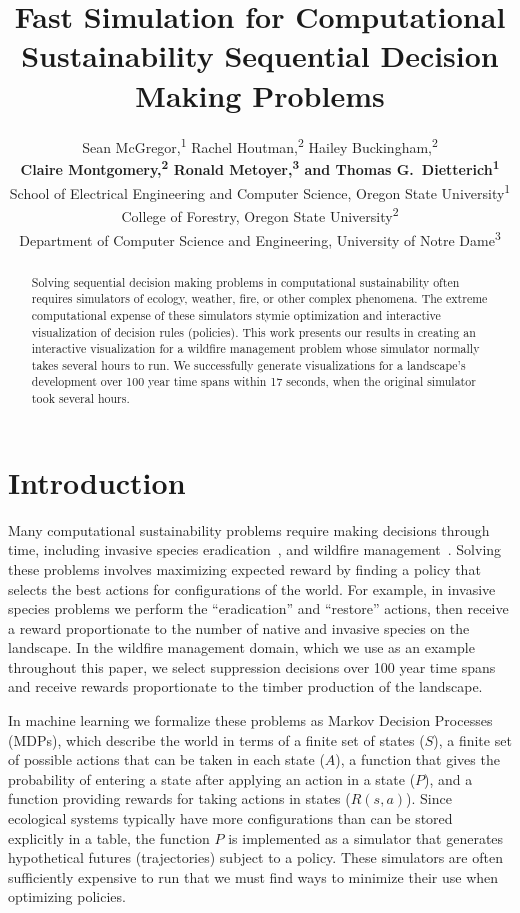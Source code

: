 \documentclass{article}
\title{Fast Simulation for Computational Sustainability Sequential Decision Making Problems}
\author{
  Sean McGregor,\textsuperscript{1} Rachel Houtman,\textsuperscript{2} Hailey Buckingham,\textsuperscript{2} \\
  \textbf{Claire Montgomery,\textsuperscript{2} Ronald Metoyer,\textsuperscript{3} and Thomas G.~Dietterich\textsuperscript{1}}\\
  School of Electrical Engineering and Computer Science, Oregon State University\textsuperscript{1}\\
  College of Forestry, Oregon State University\textsuperscript{2}\\
  Department of Computer Science and Engineering, University of Notre Dame\textsuperscript{3}\\
}
\begin{document}

\maketitle

\begin{abstract}
  Solving sequential decision making problems in computational sustainability
  often requires simulators of ecology, weather, fire, or other complex phenomena.
  The extreme computational expense of these simulators stymie
  optimization and interactive visualization of decision rules (policies).
  This work presents
  our results in creating an interactive visualization for
  a wildfire management problem whose simulator normally takes
  several hours to run. We successfully generate visualizations
  for a landscape's development over 100 year time spans within
  17 seconds, when the original simulator took several hours.
\end{abstract}

\section{Introduction}

Many computational sustainability problems require making decisions through
time, including invasive species eradication~\cite{Dietterich2013}, and
wildfire management~\cite{Houtman2013}.
Solving these problems involves maximizing expected reward
by finding a policy
that selects the best actions for configurations of the world. For example,
in invasive species problems we perform the ``eradication''
and ``restore'' actions, then receive a reward proportionate to the number
of native and invasive species on the landscape. In the wildfire management domain,
which we use as an example throughout this paper, we select suppression decisions
over 100 year time spans and receive
rewards proportionate to the timber production of the landscape.

In machine learning we formalize
these problems as Markov Decision Processes (MDPs), which
describe the world in terms of a finite set of
states ($S$), a finite set of possible actions that can
be taken in each state ($A$), a function that gives the probability
of entering a state after applying an action in a state ($P$),
and a function providing rewards for taking actions in states ($R(s,a)$).
Since ecological systems typically have more configurations than can be
stored explicitly in a table, the function $P$ is implemented
as a simulator that generates hypothetical futures (trajectories)
subject to a policy.
These simulators are often sufficiently expensive to run that
we must find ways to minimize their use when optimizing policies.
\end{document}
